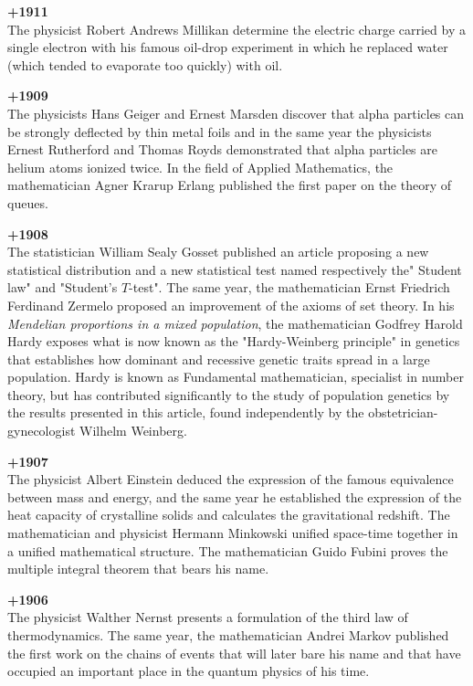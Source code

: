 \textbf{+1911}\\
The physicist Robert Andrews Millikan determine the electric charge carried by a single electron with his famous oil-drop experiment in which he replaced water (which tended to evaporate too quickly) with oil.

\textbf{+1909}\\
The physicists Hans Geiger and Ernest Marsden discover that alpha particles can be strongly deflected by thin metal foils and in the same year the physicists Ernest Rutherford and Thomas Royds demonstrated that alpha particles are helium atoms ionized twice. In the field of Applied Mathematics, the mathematician Agner Krarup Erlang published the first paper on the theory of queues. 

\textbf{+1908}\\
The statistician William Sealy Gosset published an article proposing a new statistical distribution and a new statistical test named respectively the" Student law" and "Student's $T$-test". The same year, the mathematician Ernst Friedrich Ferdinand Zermelo proposed an improvement of the axioms of set theory. In his \textit{Mendelian proportions in a mixed population}, the mathematician Godfrey Harold Hardy exposes what is now known as the "Hardy-Weinberg principle" in genetics that establishes how dominant and recessive genetic traits spread in a large population. Hardy is known as Fundamental mathematician, specialist in number theory, but has contributed significantly to the study of population genetics by the results presented in this article, found independently by the obstetrician-gynecologist Wilhelm Weinberg.

\textbf{+1907}\\
The physicist Albert Einstein deduced the expression of the famous equivalence between mass and energy, and the same year he established the expression of the heat capacity of crystalline solids and calculates the gravitational redshift. The mathematician and physicist Hermann Minkowski unified space-time together in a unified mathematical structure. The mathematician Guido Fubini proves the multiple integral theorem that bears his name.

\textbf{+1906}\\
The physicist Walther Nernst presents a formulation of the third law of thermodynamics. The same year, the mathematician Andrei Markov published the first work on the chains of events that will later bare his name and that have occupied an important place in the quantum physics of his time. 

